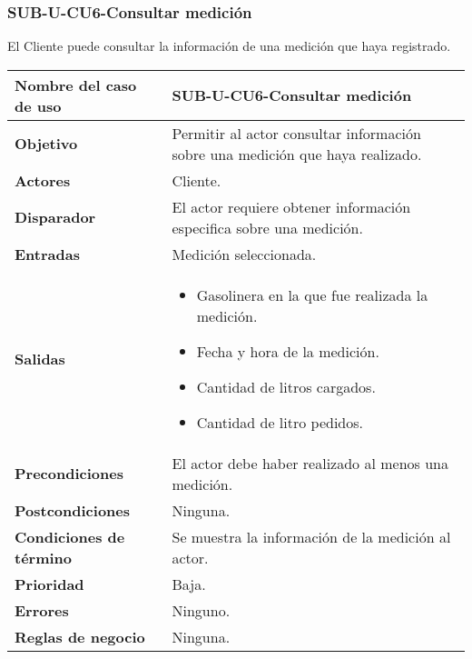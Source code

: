 \subsubsection{SUB-U-CU6-Consultar medición}\label{SUB-U-CU6}
El Cliente puede consultar la información de una medición que haya registrado.

\begin{longtable}{|J{5cm}|J{10.3cm}|}
	\hline
	\textbf{Nombre del caso de uso} &
		SUB-U-CU6-Consultar medición \\ \hline
	\textbf{Objetivo} &
		Permitir al actor consultar información sobre una medición que haya realizado. \\ \hline
	\textbf{Actores} &
		Cliente. \\ \hline 
	\textbf{Disparador} & 
		El actor requiere obtener información especifica sobre una medición.\\ \hline 
	\textbf{Entradas} & Medición seleccionada.
		\\ \hline 
	\textbf{Salidas} & 
		\begin{itemize}
			\item Gasolinera en la que fue realizada la medición.
			\item Fecha y hora de la medición.
			\item Cantidad de litros cargados.
			\item Cantidad de litro pedidos.
		\end{itemize} 
		\\ \hline
	\textbf{Precondiciones} &
		El actor debe haber realizado al menos una medición.\\ \hline
	\textbf{Postcondiciones} & Ninguna.
		\\ \hline
	\textbf{Condiciones de término} & Se muestra la información de la medición al actor.
		\\ \hline 
	\textbf{Prioridad} & 
		Baja. \\ \hline
	\textbf{Errores} & Ninguno.
		\\ \hline
	\textbf{Reglas de negocio} & Ninguna.
		 \\ \hline
\end{longtable}

